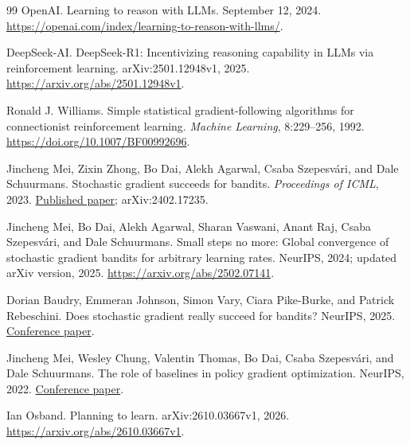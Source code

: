 \documentclass[11pt,twoside]{article}
\theoremstyle{definition}
\theoremstyle{remark}
\begin{document}
\begin{thebibliography}{99}
OpenAI.
\newblock Learning to reason with LLMs.
\newblock September 12, 2024.
\newblock \url{https://openai.com/index/learning-to-reason-with-llms/}.

DeepSeek-AI.
\newblock DeepSeek-R1: Incentivizing reasoning capability in LLMs via
reinforcement learning.
\newblock arXiv:2501.12948v1, 2025.
\newblock \url{https://arxiv.org/abs/2501.12948v1}.

Ronald J. Williams.
\newblock Simple statistical gradient-following algorithms for connectionist
reinforcement learning.
\newblock \emph{Machine Learning}, 8:229--256, 1992.
\newblock \url{https://doi.org/10.1007/BF00992696}.

Jincheng Mei, Zixin Zhong, Bo Dai, Alekh Agarwal, Csaba Szepesv\'ari,
and Dale Schuurmans.
\newblock Stochastic gradient succeeds for bandits.
\newblock \emph{Proceedings of ICML}, 2023.
\newblock \href{https://proceedings.mlr.press/v202/mei23a/mei23a.pdf}{Published paper};
arXiv:2402.17235.

Jincheng Mei, Bo Dai, Alekh Agarwal, Sharan Vaswani, Anant Raj,
Csaba Szepesv\'ari, and Dale Schuurmans.
\newblock Small steps no more: Global convergence of stochastic gradient
bandits for arbitrary learning rates.
\newblock NeurIPS, 2024; updated arXiv version, 2025.
\newblock \url{https://arxiv.org/abs/2502.07141}.

Dorian Baudry, Emmeran Johnson, Simon Vary, Ciara Pike-Burke,
and Patrick Rebeschini.
\newblock Does stochastic gradient really succeed for bandits?
\newblock NeurIPS, 2025.
\newblock \href{https://proceedings.neurips.cc/paper_files/paper/2025/file/a4e683f0ce6b91e7fbdae9d32642d88f-Paper-Conference.pdf}{Conference paper}.

Jincheng Mei, Wesley Chung, Valentin Thomas, Bo Dai,
Csaba Szepesv\'ari, and Dale Schuurmans.
\newblock The role of baselines in policy gradient optimization.
\newblock NeurIPS, 2022.
\newblock \href{https://papers.neurips.cc/paper_files/paper/2022/file/718d02a76d69686a36eccc8cde3e6a41-Paper-Conference.pdf}{Conference paper}.

Ian Osband.
\newblock Planning to learn.
\newblock arXiv:2610.03667v1, 2026.
\newblock \url{https://arxiv.org/abs/2610.03667v1}.


\end{thebibliography}
\end{document}
